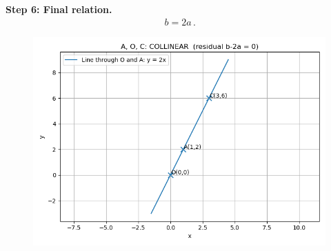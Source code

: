 \documentclass[journal,12pt,onecolumn]{IEEEtran}
\theoremstyle{remark}
\begin{document}
\textbf{Step 6: Final relation.}
\begin{align*}
\boxed{\,b=2a\,}.
\end{align*}

\newpage
\begin{figure}[h!]
\centering
\includegraphics[width=0.7\columnwidth]{figs/Figure_1.png}
\caption{}
\label{}
\end{figure}
\end{document}
